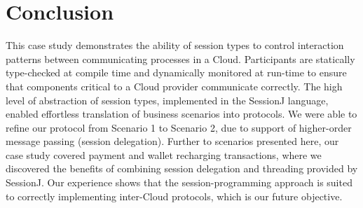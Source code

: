 \documentclass[10pt]{llncs}
\begin{document}


\section{Conclusion}
\label{sect:conclusion}
This case study demonstrates the ability of session types to control interaction patterns between communicating processes in a Cloud.
Participants are statically type-checked at compile time and dynamically monitored at run-time to ensure that components critical to a Cloud provider communicate correctly.
The high level of abstraction of session types, implemented in the SessionJ language, enabled effortless translation of business scenarios into protocols.
We were able to refine our protocol from Scenario 1 to Scenario 2, due to support of higher-order message passing (session delegation). %
Further to scenarios presented here, our case study covered payment and wallet recharging transactions, %
where we discovered the benefits of combining session delegation and threading provided by SessionJ.
Our experience shows that the session-programming approach is suited to correctly implementing inter-Cloud protocols, which is our future objective. %
\end{document}
